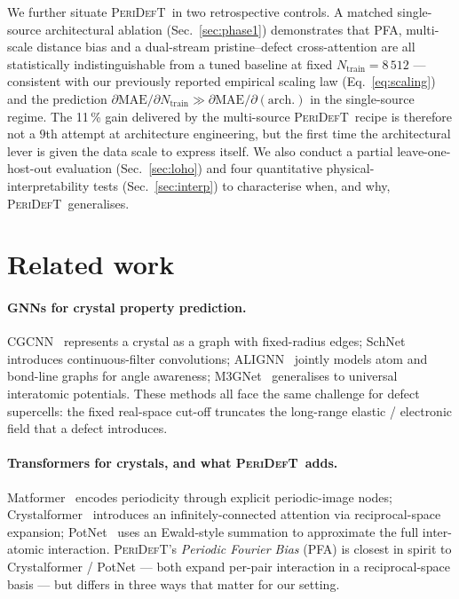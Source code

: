 \documentclass[11pt,a4paper]{article}
\newcommand{\modelname}{\textsc{PeriDefT}}
\begin{document}
We further situate \modelname\ in two retrospective controls. A
matched single-source architectural ablation (Sec.~\ref{sec:phase1})
demonstrates that PFA, multi-scale distance bias and a dual-stream
pristine--defect cross-attention are all statistically
indistinguishable from a tuned baseline at fixed
$N_{\mathrm{train}} = 8\,512$ --- consistent with our previously
reported empirical scaling law (Eq.~\ref{eq:scaling}) and the
prediction $\partial\mathrm{MAE}/\partial N_{\mathrm{train}}
\gg \partial\mathrm{MAE}/\partial(\mathrm{arch.})$ in the
single-source regime. The 11\,\% gain delivered by the multi-source
\modelname\ recipe is therefore not a $9$th attempt at architecture
engineering, but the first time the architectural lever is given
the data scale to express itself. We also conduct a partial
leave-one-host-out evaluation (Sec.~\ref{sec:loho}) and four
quantitative physical-interpretability tests
(Sec.~\ref{sec:interp}) to characterise when, and why, \modelname\
generalises.

\section{Related work}\label{sec:related}

\paragraph{GNNs for crystal property prediction.}
CGCNN~\cite{Xie2018CGCNN} represents a crystal as a graph with
fixed-radius edges; SchNet~\cite{Schutt2018SchNet} introduces
continuous-filter convolutions; ALIGNN~\cite{Choudhary2021ALIGNN}
jointly models atom and bond-line graphs for angle awareness;
M3GNet~\cite{Chen2022M3GNet} generalises to universal interatomic
potentials. These methods all face the same challenge for defect
supercells: the fixed real-space cut-off truncates the long-range
elastic / electronic field that a defect introduces.

\paragraph{Transformers for crystals, and what \modelname\ adds.}
Matformer~\cite{Yan2022Matformer} encodes periodicity through
explicit periodic-image nodes;
Crystalformer~\cite{Taniai2024Crystalformer} introduces an
infinitely-connected attention via reciprocal-space expansion;
PotNet~\cite{Lin2023PotNet} uses an Ewald-style summation to
approximate the full inter-atomic interaction. \modelname's
\emph{Periodic Fourier Bias} (PFA) is closest in spirit to
Crystalformer / PotNet --- both expand per-pair interaction in a
reciprocal-space basis --- but differs in three ways that matter
for our setting.
\end{document}
